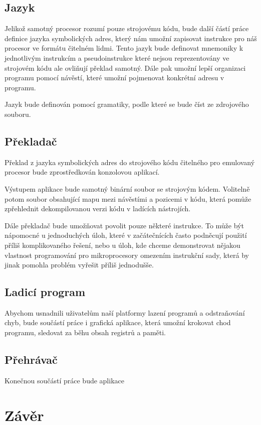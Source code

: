 \subsection{Jazyk}

Jelikož samotný procesor rozumí pouze strojovému kódu, bude další částí práce definice jazyka symbolických adres, který nám umožní zapisovat instrukce pro náš procesor ve formátu čitelném lidmi. Tento jazyk bude definovat mnemoniky k jednotlivým instrukcím a pseudoinstrukce které nejsou reprezentovány ve strojovém kódu ale ovliňují překlad samotný. Dále pak umožní lepší organizaci programu pomocí návěstí, které umožní pojmenovat konkrétní adresu v programu.

Jazyk bude definován pomocí gramatiky, podle které se bude číst ze zdrojového souboru.

\subsection{Překladač}

Překlad z jazyka symbolických adres do strojového kódu čitelného pro emulovaný procesor bude zprostředkován konzolovou aplikací.

Výstupem aplikace bude samotný binární soubor se strojovým kódem. Volitelně potom soubor obsahující mapu mezi návěstími a pozicemi v kódu, která pomůže zpřehlednit dekompilovanou verzi kódu v ladících nástrojích.

Dále překladač bude umožňovat povolit pouze některé instrukce. To může být nápomocné u jednoduchých úloh, které v začátečnících často podněcují použití příliš komplikovaného řešení, nebo u úloh, kde chceme demonstrovat nějakou vlastnost programování pro mikroprocesory omezením instrukční sady, která by jinak pomohla problém vyřešit příliš jednodušše.

\subsection{Ladicí program}

Abychom usnadnili uživatelům naší platformy lazení programů a odstraňování chyb, bude součástí práce i grafická aplikace, která umožní krokovat chod programu, sledovat za běhu obsah registrů a paměti.

\subsection{Přehrávač}

Konečnou součástí práce bude aplikace

\section{Závěr}

\blind[1]